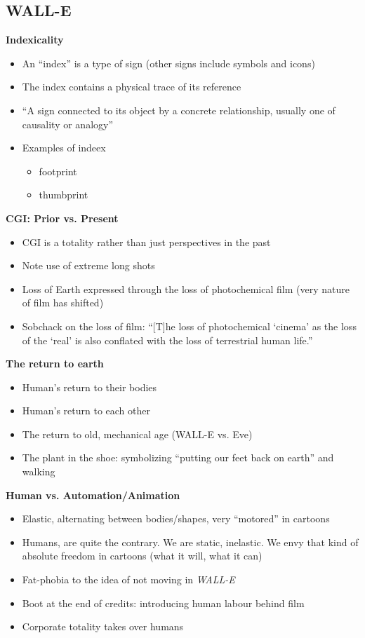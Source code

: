 \documentclass[11pt,fleqn]{book} %
\begin{document}
\subsection{WALL-E}
\textbf{Indexicality}
\begin{itemize}
    \item An \enquote{index} is a type of sign (other signs include symbols and icons)
    \item The index contains a physical trace of its reference
    \item \enquote{A sign connected to its object by a
concrete relationship, usually one of
causality or analogy}
    \item Examples of indeex
    \begin{itemize}
        \item footprint
        \item thumbprint
    \end{itemize}
\end{itemize}
\textbf{CGI: Prior vs. Present}
\begin{itemize}
    \item CGI is a totality rather than just perspectives in the past
    \item Note use of extreme long shots
    \item Loss of Earth expressed through the loss of photochemical film (very nature of film has shifted)
    \item Sobchack on the loss of film: \enquote{[T]he loss of photochemical ‘cinema’ as
the loss of the ‘real’ is also conflated
with the loss of terrestrial human life.}
\end{itemize}
\textbf{The return to earth}
\begin{itemize}
    \item Human's return to their bodies
    \item Human's return to each other
    \item The return to old, mechanical age (WALL-E vs. Eve)
    \item The plant in the shoe: symbolizing \enquote{putting our feet back on earth} and walking
\end{itemize}
\textbf{Human vs. Automation/Animation}
\begin{itemize}
    \item Elastic, alternating between bodies/shapes, very \enquote{motored} in cartoons
    \item Humans, are quite the contrary. We are static, inelastic. We envy that kind of absolute freedom in cartoons (what it will, what it can)
    \item Fat-phobia to the idea of not moving in \textit{WALL-E}
    \item Boot at the end of credits: introducing human labour behind film
    \item Corporate totality takes over humans
\end{itemize}
\end{document}
